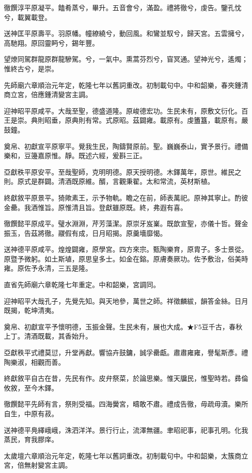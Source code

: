 \begin{pinyinscope}
徹饌淳平原凝平。饁肴蒸兮，畢升。五音會兮，滿盈。禮將徹兮，虔告。鑒孔忱兮，載翼載登。

送神匡平原壽平。羽原幡。幢繚繞兮，動回風。和鸞並馭兮，歸天宮。五雲擁兮，高馳翔。原回靈眄兮，錫年豐。

望燎同駕群龍原群龍驂駕。兮，一氣中。熏蒿芬烈兮，窅冥通。望神光兮，遙燭；惟終古兮，是崇。

先師廟六章順治元年定，乾隆七年以舊詞重改。初制載句中。中和韶樂，春夾鍾清商立宮，倍應鍾清變宮主調。

迎神昭平原咸平。大哉至聖，德盛道隆。原峻德宏功。生民未有，原敷文衍化。百王是崇。典則昭垂，原典則有常。式原昭。茲闢雍。載原有。虔簠簋，載原有。嚴鼓鐘。

奠帛、初獻宣平原寧平。覺我生民，陶鑄賢原前。聖。巍巍泰山，實予景行。禮備樂和，豆籩嘉原惟。靜。既述六經，爰斟三正。

亞獻秩平原安平。至哉聖師，克明明德。原天授明德。木鐸萬年，原世。維民之則。原式是群闢。清酒既原維。醑，言觀秉翟。太和常流，英材斯植。

終獻敘平原景平。猗歟素王，示予物軌。瞻之在前，師表萬祀。原神其寧止。酌彼金罍。我酒惟旨。原惟清且旨。登獻雖原既。終，弗遐有喜。

徹饌懿平原成平。璧水淵淵，芹芳藻潔。原崇牙岌嶪。既歆宣聖，亦儀十哲。聲金振玉，告茲將徹。鬷假有成，日月昭揭。原羹墻靡愒。

送神德平原咸平。煌煌闢雍，原學宮。四方來宗。甄陶樂育，原胄子。多士景從。原暨予微躬。如土斯埴，原思皇多士。如金在鎔。原膚奏厥功。佐予敷治，俗美時雍。原佐予永清，三五是隆。

直省先師廟六章乾隆七年重定。中和韶樂，宮調同。

迎神昭平大哉孔子，先覺先知。與天地參，萬世之師。祥徵麟紱，韻答金絲。日月既揭，乾坤清夷。

奠帛、初獻宣平予懷明德，玉振金聲。生民未有，展也大成。★F5豆千古，春秋上丁。清酒既載，其香始升。

亞獻秩平式禮莫愆，升堂再獻。響協卉鼓鏞，誠孚罍甗。肅肅雍雍，譽髦斯彥。禮陶樂淑，相觀而善。

終獻敘平自古在昔，先民有作。皮弁祭菜，於論思樂。惟天牖民，惟聖時若。彞倫攸敘，至今木鐸。

徹饌懿平先師有言，祭則受福。四海黌宮，疇敢不肅。禮成告徹，毋疏毋瀆。樂所自生，中原有菽。

送神德平鳧繹峨峨，洙泗洋洋。景行行止，流澤無疆。聿昭祀事，祀事孔明。化我蒸民，育我膠庠。

太歲壇六章順治元年定，乾隆七年以舊詞重改。初制載句中。中和韶樂，太簇商立宮，倍無射變宮主調。


\end{pinyinscope}
